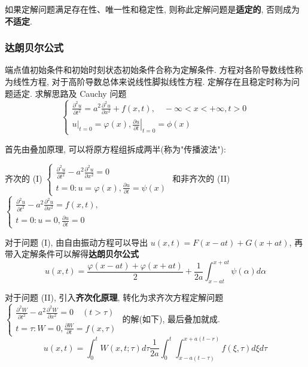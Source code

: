 \documentclass[10pt]{yerbaformat}
\begin{document}
\par 如果定解问题满足存在性、唯一性和稳定性, 则称此定解问题是\textbf{适定的}, 否则成为\textbf{不适定}.

\subsubsection{达朗贝尔公式}

\par 端点值初始条件和初始时刻状态初始条件合称为定解条件. 方程对各阶导数线性称为线性方程, 对于高阶导数总体来说线性脚拟线性方程. 定解存在且稳定时称为问题适定. 求解思路及 Cauchy 问题
$$
    \left\{\begin{array}{l}
        \frac{\partial^{2} u}{\partial t^{2}}=a^{2} \frac{\partial^{2} u}{\partial x^{2}} + f(x, t), \quad-\infty<x<+\infty, t>0 \\
        \left.u\right|_{t=0}=\varphi(x),\left.\frac{\partial u}{\partial t}\right|_{t=0}=\phi(x)
    \end{array}\right.
$$
\par 首先由叠加原理, 可以将原方程组拆成两半(称为"传播波法"):

齐次的 (I) $\left\{\begin{array}{l}\frac{\partial^{2} u}{\partial t^{2}}-a^{2} \frac{\partial^{2} u}{\partial x^{2}}=0 \\ t=0: u=\varphi(x), \frac{\partial u}{\partial t}=\psi(x)\end{array}\right.$
和非齐次的 (II) $\left\{\begin{array}{l}\frac{\partial^{2} u}{\partial t^{2}}-a^{2} \frac{\partial^{2} u}{\partial x^{2}}=f(x, t), \\ t=0: u=0, \frac{\partial u}{\partial t}=0\end{array}\right.$

\par 对于问题 (I), 由自由振动方程可以导出 $u(x, t)=F(x-a t)+G(x+a t)$, 再带入定解条件可以解得\textbf{达朗贝尔公式}
$$
    u(x, t)=\frac{\varphi(x-a t)+\varphi(x+a t)}{2}+\frac{1}{2 a} \int_{x-a t}^{x+a t} \psi(\alpha) d \alpha
$$

\par 对于问题 (II), 引入\textbf{齐次化原理}, 转化为求齐次方程定解问题 $\left\{\begin{array}{l}\frac{\partial^{2} W}{\partial t^{2}}-a^{2} \frac{\partial^{2} W}{\partial x^{2}}=0 \quad(t>\tau) \\ t=\tau: W=0, \frac{\partial W}{\partial t}=f(x, \tau)\end{array}\right.$ 的解(如下), 最后叠加就成. $$u(x, t)=\int_{0}^{t} W(x, t ; \tau) d \tau \frac{1}{2 a} \int_{0}^{t} \int_{x-a(t-\tau)}^{x+a(t-r)} f(\xi, \tau) d \xi d \tau $$
\end{document}
